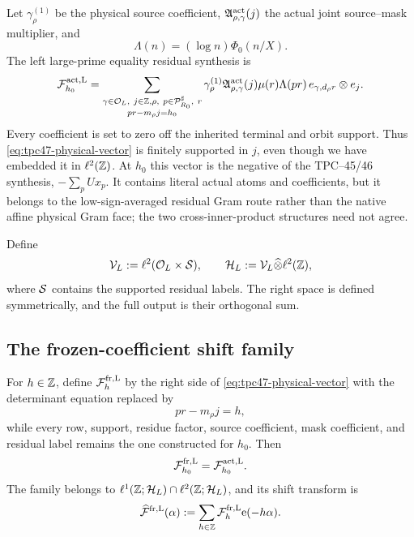 Let \(\gamma_\rho^{(1)}\) be the physical source coefficient,
\(\mathfrak A_{\rho,\gamma}^{\rm act}(j)\) the actual joint
source--mask multiplier, and
\begin{equation}
 \Lambda(n)=(\log n)\Phi_0(n/X).
 \label{eq:tpc47-terminal-weight}
\end{equation}
The left large-prime equality residual synthesis is
\begin{equation}
 \mathcal F_{h_0}^{\rm act,L}
 =\sum_{\substack{\gamma\in\mathcal O_L,\ j\in\mathbb Z,
                   \rho,\ p\in\mathcal P_{R_0}^{\sharp},\ r\\
                   pr-m_\rho j=h_0}}
 \gamma_\rho^{(1)}
 \mathfrak A_{\rho,\gamma}^{\rm act}(j)
 \mu(r)\Lambda(pr)\,
 e_{\gamma,d_\rho r}\otimes e_j.
 \label{eq:tpc47-physical-vector}
\end{equation}
Every coefficient is set to zero off the inherited terminal and orbit
support.  Thus \eqref{eq:tpc47-physical-vector} is finitely supported
in \(j\), even though we have embedded it in \(\ell^2(\mathbb Z)\).
At \(h_0\) this vector is the negative of the TPC--45/46 synthesis,
\(-\sum_pUx_p\).  It contains literal actual atoms and coefficients,
but it belongs to the low-sign-averaged residual Gram route rather than
the native affine physical Gram face; the two cross-inner-product
structures need not agree.

Define
\begin{equation}
 \mathcal V_L:=\ell^2(\mathcal O_L\times\mathcal S),
 \qquad
 \mathcal H_L:=\mathcal V_L\widehat\otimes\ell^2(\mathbb Z),
 \label{eq:tpc47-output-Hilbert-space}
\end{equation}
where \(\mathcal S\) contains the supported residual labels.  The right
space is defined symmetrically, and the full output is their orthogonal
sum.

\subsection{The frozen-coefficient shift family}

For \(h\in\mathbb Z\), define \(\mathcal F_h^{\rm fr,L}\) by the right side of
\eqref{eq:tpc47-physical-vector} with the determinant equation replaced
by
\begin{equation}
 pr-m_\rho j=h,
 \label{eq:tpc47-frozen-determinant}
\end{equation}
while every row, support, residue factor, source coefficient, mask
coefficient, and residual label remains the one constructed for
\(h_0\).  Then
\begin{equation}
 \mathcal F_{h_0}^{\rm fr,L}=\mathcal F_{h_0}^{\rm act,L}.
 \label{eq:tpc47-frozen-physical-agreement}
\end{equation}
The family belongs to \(\ell^1(\mathbb Z;\mathcal H_L)\cap
\ell^2(\mathbb Z;\mathcal H_L)\), and its shift transform is
\begin{equation}
 \widehat{\mathcal F}^{\rm fr,L}(\alpha)
 :=\sum_{h\in\mathbb Z}\mathcal F_h^{\rm fr,L}\mathrm e(-h\alpha).
 \label{eq:tpc47-frozen-shift-transform}
\end{equation}

